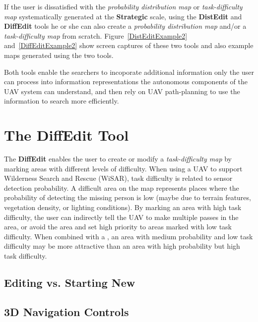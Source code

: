 If the user is dissatisfied with the \textit{probability distribution map} or \textit{task-difficulty map} systematically generated at the \textbf{Strategic} scale, using the \textbf{DistEdit} and \textbf{DiffEdit} tools he or she can also create a \textit{probability distribution map} and/or a \textit{task-difficulty map} from scratch. Figure~\ref{DistEditExample2} and~\ref{DiffEditExample2} show screen captures of these two tools and also example maps generated using the two tools.

Both tools enable the searchers to incoporate additional information only the user can process into information representations the autonomous components of the UAV system can understand, and then rely on UAV path-planning to use the information to search more efficiently.

\section{The DiffEdit Tool}
\label{DiffEdit}

The \textbf{DiffEdit} enables the user to create or modify a \textit{task-difficulty map} by marking areas with different levels of difficulty. When using a UAV to support Wilderness Search and Rescue (WiSAR), task difficulty is related to sensor detection probability. A difficult area on the map represents places where the probability of detecting the missing person is low (maybe due to terrain features, vegetation density, or lighting conditions). By marking an area with high task difficulty, the user can indirectly tell the UAV to make multiple passes in the area, or avoid the area and set high priority to areas marked with low task difficulty. When combined with a , an area with medium probability and low task difficulty may be more attractive than an area with high probability but high task difficulty.

\subsection{Editing vs. Starting New}


\subsection{3D Navigation Controls}

